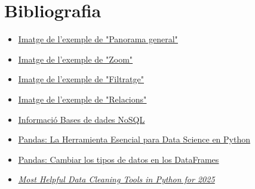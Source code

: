 \documentclass[a4paper,12pt]{report}
\begin{document}
\section*{Bibliografia}
\begin{itemize}
    \item \href{https://evotic.es/wp-content/uploads/2022/10/dashboard_ventas.png}{\underline{Imatge de l'exemple de "Panorama general"}}
    \item \href{https://r-charts.com/es/correlacion/zoom-grafico_files/figure-html/zoom.png}{\underline{Imatge de l'exemple de "Zoom"}}
    \item \href{https://cdn.exceltotal.com/wp-content/uploads/2014/02/filtros-en-excel-03.png}{\underline{Imatge de l'exemple de "Filtratge"}}
    \item \href{https://cdn.kastatic.org/ka-perseus-images/8aa21944eef2879cea9080a2ae2fbcb98cec0ddf.png}{\underline{Imatge de l'exemple de "Relacions"}}
    \item \href{https://www.arsys.es/blog/bases-de-datos-nosql-que-son-tipos-y-ventajas#tree-3}{\underline{Informació Bases de dades NoSQL}}
    \item \href{https://iddigitalschool.com/bootcamps/que-es-pandas/#:~:text=Funcionalidades%20Clave,filtrar%2C%20agregar%20y%20resumir%20datos.}{\underline{Pandas: La Herramienta Esencial para Data Science en Python}}
    \item \href{https://www.analyticslane.com/2021/07/15/pandas-cambiar-los-tipos-de-datos-en-los-dataframes/}{\underline{Pandas: Cambiar los tipos de datos en los DataFrames}}
    \item \href{https://hevodata.com/learn/guide-to-effective-data-cleaning-tools-in-python/#:~:text=1.-,Pandas,your%20data%20for%20further%20exploration.}{\underline{\textit{Most Helpful Data Cleaning Tools in Python for 2025}}}
\end{itemize}
\end{document}
